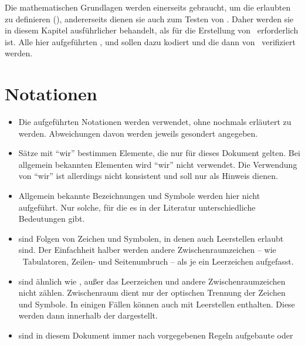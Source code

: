 Die mathematischen Grundlagen werden einerseits gebraucht, um die erlaubten  zu definieren (), andererseits dienen sie auch zum Testen von \ASBA.
Daher werden sie in diesem Kapitel ausführlicher behandelt, als für die Erstellung von \ASBA\ erforderlich ist.
Alle hier aufgeführten ,  und  sollen dazu kodiert und die  dann von \ASBA\ verifiziert werden.

\section{Notationen}%
\label{sec:Notationen}

\begin{itemize}
	\item Die  aufgeführten Notationen werden  verwendet, ohne nochmals erläutert zu werden. Abweichungen davon werden jeweils gesondert angegeben.
	\item Sätze mit \enquote{wir} bestimmen Elemente, die nur für dieses Dokument gelten.
	Bei allgemein bekannten Elementen wird \enquote{wir} nicht verwendet.
	Die Verwendung von \enquote{wir} ist allerdings nicht konsistent und soll nur als Hinweis dienen.
	\item Allgemein bekannte Bezeichnungen und Symbole werden hier nicht aufgeführt.
	Nur solche, für die es in der Literatur unterschiedliche Bedeutungen gibt.
	\item \emph{} sind Folgen von Zeichen und Symbolen, in denen auch Leerstellen erlaubt sind.
	Der Einfachheit halber werden andere Zwischenraumzeichen -- wie \textzB\ Tabulatoren, Zeilen- und Seitenumbruch -- als je ein Leerzeichen aufgefasst.
	\item \emph{} sind ähnlich wie , außer das Leerzeichen und andere Zwischenraumzeichen nicht zählen.
	Zwischenraum dient nur der optischen Trennung der Zeichen und Symbole.
	In einigen Fällen können  auch  mit Leerstellen enthalten.
	Diese werden dann innerhalb der   dargestellt.
	\item \emph{} sind in diesem Dokument immer nach vorgegebenen Regeln aufgebaute  oder %

\end{itemize}
